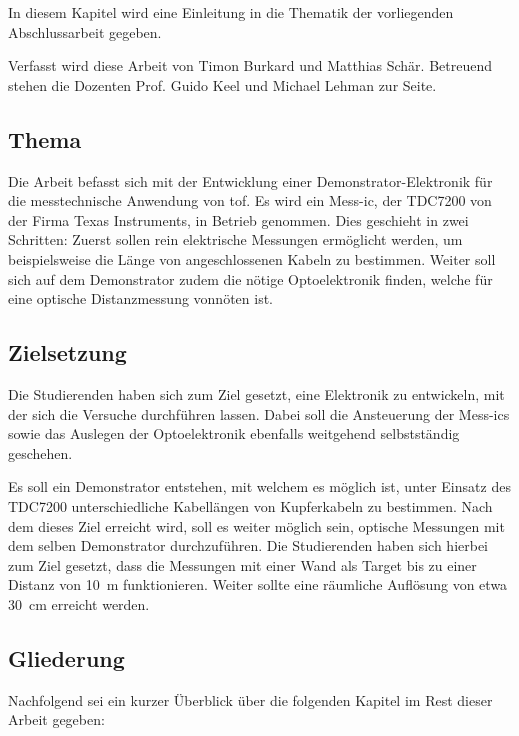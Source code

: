 In diesem Kapitel wird eine Einleitung in die Thematik der vorliegenden Abschlussarbeit gegeben.

Verfasst wird diese Arbeit von Timon Burkard und Matthias Schär. Betreuend stehen die Dozenten Prof. Guido Keel und
Michael Lehman zur Seite.

\subsection{Thema}
Die Arbeit befasst sich mit der Entwicklung einer Demonstrator-Elektronik für die messtechnische Anwendung von \acrlong{tof}.
Es wird ein Mess-\acrshort{ic}, der TDC7200 von der Firma Texas Instruments, in Betrieb genommen. Dies geschieht in zwei
Schritten: Zuerst sollen rein elektrische Messungen ermöglicht werden, um beispielsweise die Länge von angeschlossenen
Kabeln zu bestimmen. Weiter soll sich auf dem Demonstrator zudem die nötige Optoelektronik finden, welche für eine
optische Distanzmessung vonnöten ist.

\subsection{Zielsetzung}
Die Studierenden haben sich zum Ziel gesetzt, eine Elektronik zu entwickeln, mit der sich die Versuche durchführen
lassen. Dabei soll die Ansteuerung der Mess-\acrshort{ic}s sowie das Auslegen der Optoelektronik ebenfalls weitgehend
selbstständig geschehen.

Es soll ein Demonstrator entstehen, mit welchem es möglich ist, unter Einsatz des TDC7200 unterschiedliche Kabellängen von
Kupferkabeln zu bestimmen. Nach dem dieses Ziel erreicht wird, soll es weiter möglich sein, optische Messungen mit dem
selben Demonstrator durchzuführen. Die Studierenden haben sich hierbei zum Ziel gesetzt, dass die Messungen mit einer Wand
als Target bis zu einer Distanz von 10~m funktionieren. Weiter sollte eine räumliche Auflösung von etwa 30~cm erreicht werden.

\subsection{Gliederung}
Nachfolgend sei ein kurzer Überblick über die folgenden Kapitel im Rest dieser Arbeit gegeben:



